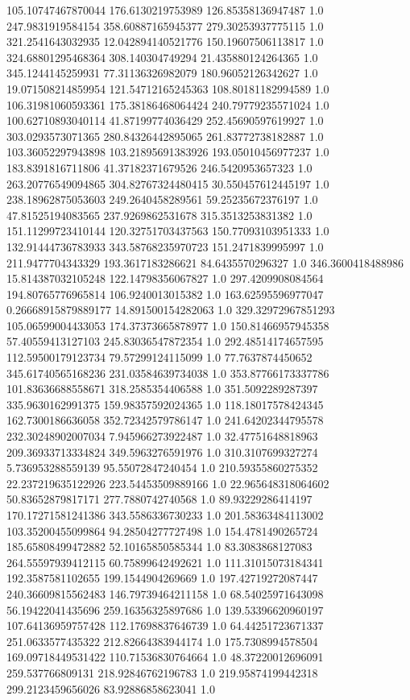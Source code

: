105.10747467870044	176.6130219753989	126.85358136947487	1.0
247.9831919584154	358.60887165945377	279.30253937775115	1.0
321.2541643032935	12.042894140521776	150.19607506113817	1.0
324.68801295468364	308.140304749294	21.435880124264365	1.0
345.1244145259931	77.31136326982079	180.96052126342627	1.0
19.071508214859954	121.54712165245363	108.80181182994589	1.0
106.31981060593361	175.38186468064424	240.79779235571024	1.0
100.62710893040114	41.87199774036429	252.45690597619927	1.0
303.0293573071365	280.84326442895065	261.83772738182887	1.0
103.36052297943898	103.21895691383926	193.05010456977237	1.0
183.8391816711806	41.37182371679526	246.5420953657323	1.0
263.20776549094865	304.82767324480415	30.550457612445197	1.0
238.18962875053603	249.2640458289561	59.25235672376197	1.0
47.81525194083565	237.9269862531678	315.3513253831382	1.0
151.11299723410144	120.32751703437563	150.77093103951333	1.0
132.91444736783933	343.58768235970723	151.2471839995997	1.0
211.9477704343329	193.3617183286621	84.6435570296327	1.0
346.3600418488986	15.814387032105248	122.14798356067827	1.0
297.4209908084564	194.80765776965814	106.9240013015382	1.0
163.62595596977047	0.26668915879889177	14.891500154282063	1.0
329.32972967851293	105.06599004433053	174.37373665878977	1.0
150.81466957945358	57.40559413127103	245.83036547872354	1.0
292.48514174657595	112.59500179123734	79.57299124115099	1.0
77.7637874450652	345.61740565168236	231.03584639734038	1.0
353.87766173337786	101.83636688558671	318.2585354406588	1.0
351.5092289287397	335.9630162991375	159.98357592024365	1.0
118.18017578424345	162.7300186636058	352.72342579786147	1.0
241.64202344795578	232.30248902007034	7.945966273922487	1.0
32.47751648818963	209.36933713334824	349.5963276591976	1.0
310.3107699327274	5.736953288559139	95.55072847240454	1.0
210.59355860275352	22.237219635122926	223.54453509889166	1.0
22.965648318064602	50.83652879817171	277.7880742740568	1.0
89.93229286414197	170.17271581241386	343.5586336730233	1.0
201.58363484113002	103.35200455099864	94.28504277727498	1.0
154.4781490265724	185.65808499472882	52.10165850585344	1.0
83.3083868127083	264.55597939412115	60.75899642492621	1.0
111.31015073184341	192.3587581102655	199.1544904269669	1.0
197.42719272087447	240.36609815562483	146.79739464211158	1.0
68.54025971643098	56.19422041435696	259.16356325897686	1.0
139.53396620960197	107.64136959757428	112.17698837646739	1.0
64.44251723671337	251.0633577435322	212.82664383944174	1.0
175.7308994578504	169.09718449531422	110.71536830764664	1.0
48.37220012696091	259.537766809131	218.92846762196783	1.0
219.95874199442318	299.2123459656026	83.92886858623041	1.0
